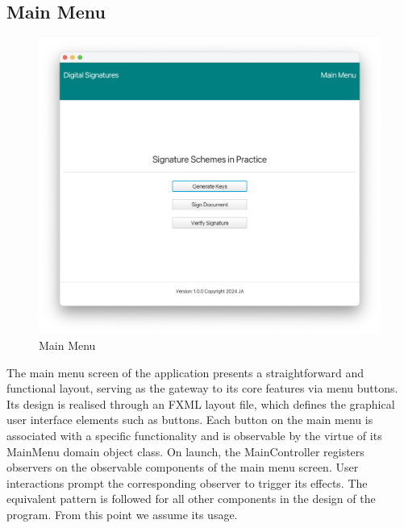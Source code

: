 \documentclass[]{final_report}
\theoremstyle{definition}
\begin{document}
\subsection{Main Menu}

\begin{figure}[H]
    \centering
    \includegraphics[scale=0.4]{main_pictures/ui/mainMenu.png}
    \caption{Main Menu}
\end{figure}
The main menu screen of the application presents a straightforward and functional layout, serving as the gateway to its core features via menu buttons. Its design is realised through an FXML layout file, which defines the graphical user interface elements such as buttons. Each button on the main menu is associated with a specific functionality and is observable by the virtue of its MainMenu domain object class. On launch, the MainController registers observers on the observable components of the main menu screen. User interactions prompt the corresponding observer to trigger its effects. The equivalent pattern is followed for all other components in the design of the program. From this point we assume its usage.
\end{document}
